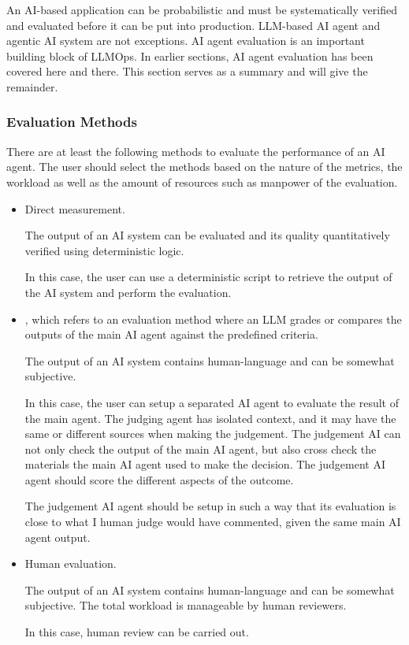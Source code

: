An AI-based application can be probabilistic and must be systematically verified and evaluated before it can be put into production. LLM-based AI agent and agentic AI system are not exceptions. AI agent evaluation is an important building block of LLMOps. In earlier sections, AI agent evaluation has been covered here and there. This section serves as a summary and will give the remainder.

\subsubsection*{Evaluation Methods}

There are at least the following methods to evaluate the performance of an AI agent. The user should select the methods based on the nature of the metrics, the workload as well as the amount of resources such as manpower of the evaluation.
\begin{itemize}
  \item Direct measurement.
  
  The output of an AI system can be evaluated and its quality quantitatively verified using deterministic logic. 
  
  In this case, the user can use a deterministic script to retrieve the output of the AI system and perform the evaluation.
  
  \item {}, which refers to an evaluation method where an LLM grades or compares the outputs of the main AI agent against the predefined criteria.
  
  The output of an AI system contains human-language and can be somewhat subjective. 
  
  In this case, the user can setup a separated AI agent to evaluate the result of the main agent. The judging agent has isolated context, and it may have the same or different sources when making the judgement. The judgement AI can not only check the output of the main AI agent, but also cross check the materials the main AI agent used to make the decision. The judgement AI agent should score the different aspects of the outcome. 
  
  The judgement AI agent should be setup in such a way that its evaluation is close to what I human judge would have commented, given the same main AI agent output.
  
  \item Human evaluation.
  
  The output of an AI system contains human-language and can be somewhat subjective. The total workload is manageable by human reviewers.
  
  In this case, human review can be carried out.
  
\end{itemize}

